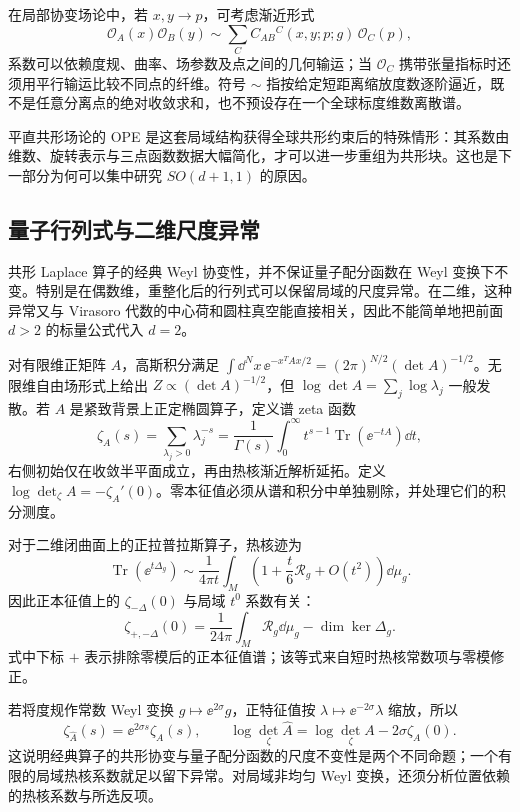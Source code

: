 在局部协变场论中，若 $x,y\to p$，可考虑渐近形式
\begin{equation}\label{eq:ghs-curved-local-ope}
 \mathcal O_A(x)\mathcal O_B(y)
 \sim\sum_C C_{AB}{}^C(x,y;p;g)\,\mathcal O_C(p),
\end{equation}
系数可以依赖度规、曲率、场参数及点之间的几何输运；当 $\mathcal O_C$ 携带张量指标时还须用平行输运比较不同点的纤维。符号 $\sim$ 指按给定短距离缩放度数逐阶逼近，既不是任意分离点的绝对收敛求和，也不预设存在一个全球标度维数离散谱。

平直共形场论的 OPE 是这套局域结构获得全球共形约束后的特殊情形：其系数由维数、旋转表示与三点函数数据大幅简化，才可以进一步重组为共形块。这也是下一部分为何可以集中研究 $SO(d+1,1)$ 的原因。


\subsection{量子行列式与二维尺度异常}

共形 Laplace 算子的经典 Weyl 协变性，并不保证量子配分函数在 Weyl 变换下不变。特别是在偶数维，重整化后的行列式可以保留局域的尺度异常。在二维，这种异常又与 Virasoro 代数的中心荷和圆柱真空能直接相关，因此不能简单地把前面 $d>2$ 的标量公式代入 $d=2$。


对有限维正矩阵 $A$，高斯积分满足 $\int\dd^Nx\,\ee^{-x^TAx/2}=(2\pi)^{N/2}(\det A)^{-1/2}$。无限维自由场形式上给出 $Z\propto(\det A)^{-1/2}$，但
$\log\det A=\sum_j\log\lambda_j$ 一般发散。若 $A$ 是紧致背景上正定椭圆算子，定义谱 zeta 函数
\begin{equation}\label{eq:ghs-zeta-operator}
 \zeta_A(s)=\sum_{\lambda_j>0}\lambda_j^{-s}
 =\frac1{\Gamma(s)}\int_0^\infty t^{s-1}\operatorname{Tr}(\ee^{-tA})\dd t,
\end{equation}
右侧初始仅在收敛半平面成立，再由热核渐近解析延拓。定义 $\log\det_\zeta A=-\zeta_A'(0)$。零本征值必须从谱和积分中单独剔除，并处理它们的积分测度。


对于二维闭曲面上的正拉普拉斯算子，热核迹为
\[
 \operatorname{Tr}(\ee^{t\Delta_g})
 \sim\frac1{4\pi t}\int_M\left(1+\frac t6\mathcal R_g+O(t^2)\right)\dd\mu_g.
\]
因此正本征值上的 $\zeta_{-\Delta}(0)$ 与局域 $t^0$ 系数有关：
\begin{equation}\label{eq:ghs-zeta-curvature-two-dimensional}
 \zeta_{+,-\Delta}(0)
 =\frac1{24\pi}\int_M\mathcal R_g\dd\mu_g-\dim\ker\Delta_g.
\end{equation}
式中下标 $+$ 表示排除零模后的正本征值谱；该等式来自短时热核常数项与零模修正。

若将度规作常数 Weyl 变换 $g\mapsto\ee^{2\sigma}g$，正特征值按 $\lambda\mapsto\ee^{-2\sigma}\lambda$ 缩放，所以
\[
 \zeta_{\widehat A}(s)=\ee^{2\sigma s}\zeta_A(s),\qquad
 \log\det_\zeta\widehat A
 =\log\det_\zeta A-2\sigma\zeta_A(0).
\]
这说明经典算子的共形协变与量子配分函数的尺度不变性是两个不同命题；一个有限的局域热核系数就足以留下异常。对局域非均匀 Weyl 变换，还须分析位置依赖的热核系数与所选反项。


